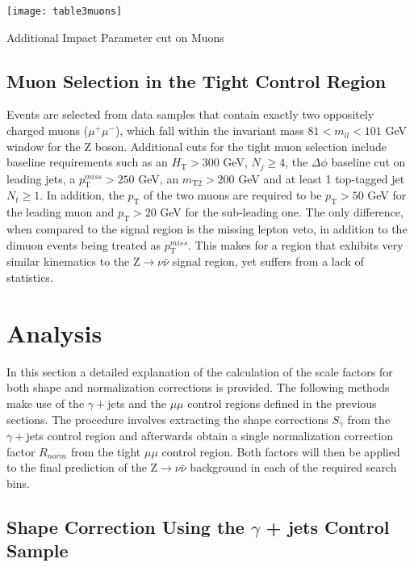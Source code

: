 \begin{table}[H]
\begin{center}
\texttt{[image: table3muons]}
\caption{Additional Impact Parameter cut on Muons}
\label{table3muons}
\end{center}
\end{table}

\subsection{Muon Selection in the Tight Control Region}\label{tightmumu}

Events are selected from data samples that contain exactly two oppositely charged muons ($\mu^{+}\mu^{-}$), which fall within the invariant mass $81 < m_{ll} < 101$ GeV window for the Z boson. Additional cuts for the tight muon selection include baseline requirements such as an $H_\text{T} > 300$ GeV, $N_j \geq 4$, the $\Delta\phi$ baseline cut on leading jets, a $p_\text{T}^{miss} > 250$ GeV, an $m_\text{T2} > 200$ GeV and at least 1 top-tagged jet $N_t \geq 1$. In addition, the $p_\text{T}$ of the two muons are required to be $p_\text{T} > 50$ GeV for the leading muon and $p_\text{T} > 20$ GeV for the sub-leading one. The only difference, when compared to the signal region is the missing lepton veto, in addition to the dimuon events being treated as $p_\text{T}^{miss}$. This makes for a region that exhibits very similar kinematics to the Z$\rightarrow\nu\bar{\nu}$ signal region, yet suffers from a lack of statistics.

\section{Analysis}

In this section a detailed explanation of the calculation of the scale factors for both shape and normalization corrections is provided. The following methods make use of the $\gamma+$jets and the $\mu\mu$ control regions defined in the previous sections. The procedure involves extracting the shape corrections $S_\gamma$ from the $\gamma+$jets control region and afterwards obtain a single normalization correction factor $R_{norm}$ from the tight $\mu\mu$ control region. Both factors will then be applied to the final prediction of the Z$\rightarrow\nu\bar{\nu}$ background in each of the required search bins. 

\subsection{Shape Correction Using the $\gamma$ + jets Control Sample}


